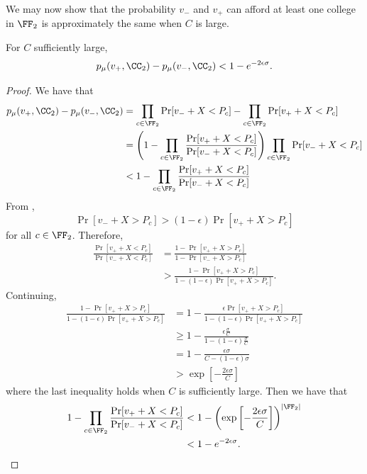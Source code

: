 \documentclass[10pt]{article}
\begin{document}
\begin{ReviewVerbatim}
We may now show that the probability $v_-$ and $v_+$ can afford at least one college in $\FF_2$ is approximately the same when $C$ is large.
\begin{proposition}\label{prop:lt-approx-F2}
For $C$ sufficiently large,
\begin{equation}
    p_\mu(v_+, \CC_2) - p_\mu(v_-, \CC_2) < 1 - e^{-2\epsilon\sigma}.
\end{equation}
\end{proposition}
\begin{proof}
We have that
\begin{align}
    p_\mu(v_+, \CC_2) - p_\mu(v_-, \CC_2)
    &= \prod_{c\in \FF_2}\Pr[v_- + X < P_c] - \prod_{c\in \FF_2}\Pr[v_+ + X < P_c]\\
    &= \left(1 - \prod_{c\in \FF_2}\frac{\Pr[v_+ + X < P_c]}{\Pr[v_- + X < P_c]}\right) \prod_{c\in \FF_2}\Pr[v_- + X < P_c]\\
    &< 1 - \prod_{c\in \FF_2}\frac{\Pr[v_+ + X < P_c]}{\Pr[v_- + X < P_c]}
\end{align}
From ,
\begin{equation}
    \Pr[v_- + X > P_c] > (1-\epsilon)\Pr[v_+ + X > P_c]
\end{equation}
for all $c\in \FF_2$. Therefore,
\begin{align}
    \frac{\Pr[v_+ + X < P_c]}{\Pr[v_- + X < P_c]} &= \frac{1 - \Pr[v_+ + X > P_c]}{1 - \Pr[v_- + X > P_c]}\\
    &> \frac{1 - \Pr[v_+ + X > P_c]}{1 - (1-\epsilon)\Pr[v_+ + X > P_c]}.
\end{align}
Continuing,
\begin{align}
    \frac{1 - \Pr[v_+ + X > P_c]}{1 - (1-\epsilon)\Pr[v_+ + X > P_c]} &= 1 - \frac{\epsilon \Pr[v_+ + X > P_c]}{1 - (1-\epsilon) \Pr[v_+ + X > P_c]}\\
    &\ge 1 - \frac{\epsilon\frac{\sigma}{C}}{1 - (1-\epsilon)\frac{\sigma}{C}}\\
    &= 1 - \frac{\epsilon\sigma}{C - (1-\epsilon)\sigma}\\
    &> \exp\left[-\frac{2\epsilon\sigma}{C}\right]
\end{align}
where the last inequality holds when $C$ is sufficiently large. Then we have that
\begin{align}
    1 - \prod_{c\in \FF_2}\frac{\Pr[v_+ + X < P_c]}{\Pr[v_- + X < P_c]}
    &< 1 - \left(\exp\left[-\frac{2\epsilon\sigma}{C}\right]\right)^{|\FF_2|}\\
    &< 1 - e^{-2\epsilon\sigma}.
\end{align}
\end{proof}


\end{ReviewVerbatim}
\end{document}
